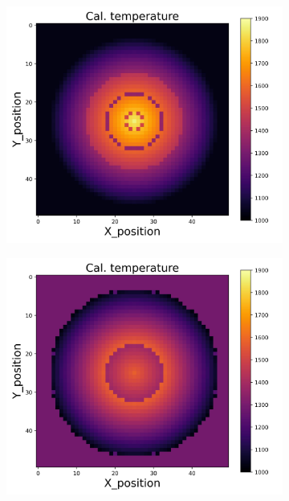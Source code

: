 {\begin{figure}[p]
\begin{minipage}{\textwidth}
\begin{subfigure}{0.325\textwidth}
        \end{subfigure}
    \end{minipage}\\
    \begin{minipage}{\textwidth}
        \centering
        \begin{subfigure}{0.325\textwidth}
            \centering
            \includegraphics[width=\textwidth]{figures/raw_data/25/linear/T_cal.jpg}
        \end{subfigure}
        \begin{subfigure}{0.325\textwidth}
            \centering
            \includegraphics[width=\textwidth]{figures/raw_data/26/linear/T_cal.jpg}

\end{subfigure}
\end{minipage}
\end{figure}}
